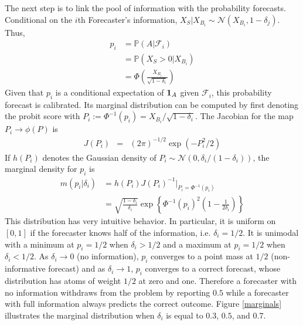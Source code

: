 \documentclass[11pt]{article}
\renewcommand{\P}{\mathbb{P}}
\theoremstyle{definition}
\theoremstyle{definition}
\def\one{{\bf 1}}
\def\P{{\mathbb P}}
\begin{document}
The next step is
to link the pool of information with the probability forecasts. Conditional on the $i$th Forecaster's information, $X_S | X_{B_i} \sim \mathcal{N}\left(X_{B_i}, 1-\delta_j\right)$. Thus,
\begin{align*}
p_i &= \P\left(A | \mathcal{F}_{i}\right)\\
 &= \P\left(X_S > 0 | X_{B_i}\right)\\
 &= \Phi\left( \frac{X_{B_i}}{\sqrt{1-\delta_i}}\right) 
\end{align*}
Given that $p_i$ is a conditional expectation of $\one_A$ given $\mathcal{F}_i$, this probability forecast is calibrated. Its marginal distribution can be computed by first denoting the probit score with $P_{i} := \Phi^{-1}(p_i) = X_{B_i}/\sqrt{1-\delta_i}$. The Jacobian for the map $P_{i} \to \phi(P)$ is
\begin{eqnarray*}
J(P_i) &=& (2\pi)^{-1/2} \exp \left( - P_i^2/2   \right) 
\end{eqnarray*}
If $h(P_i)$ denotes the Gaussian density of $P_i \sim \mathcal{N}\left(0, \delta_i / (1-\delta_i)\right)$,
the marginal density for $p_i$ is
\begin{align*}
 m\left(p_i | \delta_i \right) &= h(P_i) J(P_i)^{-1} \bigg|_{P_i = \Phi^{-1}(p_i)}\\
&= \sqrt{\frac{1-\delta_i}{\delta_i}} \exp 
   \left\{ \Phi^{-1}(p_i)^2 \left(1-\frac{1}{2 \delta_i} \right) \right\} 
\end{align*}
This distribution has very intuitive behavior. In particular, it is uniform on $[0,1]$ if the forecaster knows half of the
information, i.e. $\delta_i = 1/2$.  It is
unimodal with a minimum at $p_i = 1/2$ when $\delta_i > 1/2$ and a
maximum at $p_i = 1/2$ when $\delta_i < 1/2$.  As $\delta_i \to 0$ (no
information), $p_i$ converges to a point mass at $1/2$
(non-informative forecast) and as $\delta_i \to 1$, $p_i$ converges to
a correct forecast, whose distribution has atoms of weight $1/2$ at
zero and one. Therefore a forecaster with no information withdraws from the problem by reporting $0.5$ while a forecaster with full information always predicts the correct outcome. Figure \ref{marginals} illustrates the marginal
distribution when $\delta_i$ is equal to $0.3$, $0.5$, and $0.7$.
\end{document}
